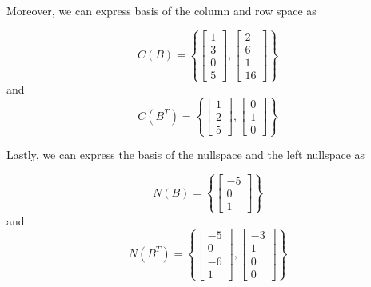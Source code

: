 Moreover, we can express basis of the column and row space as 
\begin{mdframed}[style=MyFrame]
    \begin{equation}
        C(B) =
        \left\{
        \begin{bmatrix}
            1       \\
            3       \\
            0       \\
            5
        \end{bmatrix},
        \begin{bmatrix}
            2       \\
            6       \\
            1       \\
            16
        \end{bmatrix}
        \right\}
    \end{equation}
    and
    \begin{equation}
        C(B^{T}) =
        \left\{
        \begin{bmatrix}
            1       \\
            2       \\
            5
        \end{bmatrix},
        \begin{bmatrix}
            0       \\
            1       \\
            0
        \end{bmatrix}
        \right\}
    \end{equation}
\end{mdframed}
Lastly, we can express the basis of the nullspace and the left nullspace as
\begin{mdframed}[style=MyFrame]
    \begin{equation}
        N(B) = 
        \left\{
        \begin{bmatrix}
            -5      \\
            0       \\
            1
        \end{bmatrix}
        \right\}
    \end{equation}
    and 
    \begin{equation}
        N(B^{T}) = 
        \left\{
        \begin{bmatrix}
            -5      \\
            0       \\
            -6      \\
            1
        \end{bmatrix},
        \begin{bmatrix}
            -3      \\
            1       \\
            0       \\
            0
        \end{bmatrix}
        \right\}
    \end{equation}
\end{mdframed}
